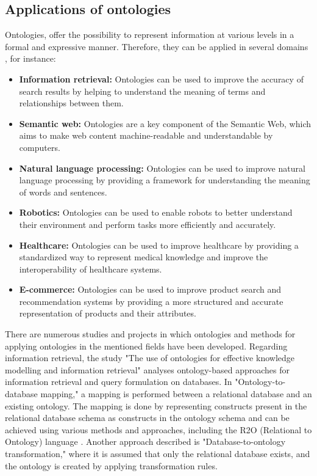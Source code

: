 \subsection{Applications of ontologies}
Ontologies, offer the possibility to represent information at various levels in a formal and expressive manner.
Therefore, they can be applied in several domains \cite{leonels2023ontology}, for instance: 
\begin{itemize}
    \item \textbf{Information retrieval:} Ontologies can be used to improve the accuracy of search results by helping to understand the meaning of terms and relationships between them.

    \item \textbf{Semantic web:} Ontologies are a key component of the Semantic Web, which aims to make web content machine-readable and understandable by computers.

    \item \textbf{Natural language processing:} Ontologies can be used to improve natural language processing by providing a framework for understanding the meaning of words and sentences.

    \item \textbf{Robotics:} Ontologies can be used to enable robots to better understand their environment and perform tasks more efficiently and accurately.

    \item \textbf{Healthcare:} Ontologies can be used to improve healthcare by providing a standardized way to represent medical knowledge and improve the interoperability of healthcare systems.

    \item \textbf{E-commerce:} Ontologies can be used to improve product search and recommendation systems by providing a more structured and accurate representation of products and their attributes.
\end{itemize}
There are numerous studies and projects in which ontologies and methods for applying ontologies in the mentioned fields have been developed. 
Regarding information retrieval, the study "The use of ontologies for effective knowledge modelling and information retrieval" \cite{munir2018use} analyses ontology-based approaches for information retrieval and query formulation on databases. 
In "Ontology-to-database mapping," a mapping is performed between a relational database and an existing ontology. The mapping is done by representing constructs present in the relational database schema as constructs in the ontology schema and can be achieved using various methods and approaches, including the R2O (Relational to Ontology) language \cite{khan2011r2o}. Another approach described is "Database-to-ontology transformation," where it is assumed that only the relational database exists, and the ontology is created by applying transformation rules. \\
